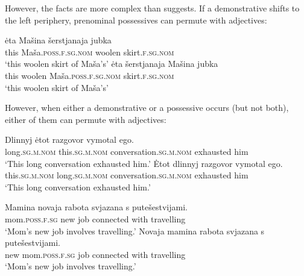 \documentclass[output=paper,
colorlinks,
citecolor=brown,
newtxmath
]{langscibook}
\begin{document}
\noindent However, the facts are more complex than \citeauthor{Pereltsvaig2007} suggests. If a demonstrative shifts to the left periphery, prenominal possessives can permute with adjectives:


\ea
    \ea \gll ėta Mašina šerstjanaja jubka\label{masinajubka1}\\
    this Maša.\textsc{poss.f.sg.nom} woolen skirt.\textsc{f.sg.nom}\\
    \glt `this woolen skirt of Maša's'
    \ex\label{masinajubka2} \gll ėta šerstjanaja Mašina jubka\\
    this woolen Maša.\textsc{poss.f.sg.nom} skirt.\textsc{f.sg.nom}\\
    \glt `this woolen skirt of Maša's'
\z\z

\noindent However, when either a demonstrative or a possessive occurs (but not both), either of them can permute with adjectives:


\ea\label{razgovor}
    \ea \gll Dlinnyj ėtot razgovor vymotal ego.\\
    long.\textsc{sg.m.nom} this.\textsc{sg.m.nom} conversation.\textsc{sg.m.nom} exhausted him\\
    \glt `This long conversation exhausted him.'
    \ex \gll Ėtot dlinnyj razgovor vymotal ego.\\
    this.\textsc{sg.m.nom} long.\textsc{sg.m.nom} conversation.\textsc{sg.m.nom} exhausted him\\
    \glt `This long conversation exhausted him.'
\z\z


\ea\label{rabota}
    \ea \gll Mamina novaja rabota svjazana s putešestvijami.\\
    mom.\textsc{poss.f.sg} new job connected with travelling\\
    \glt `Mom's new job involves travelling.'
    \ex \gll Novaja mamina rabota svjazana s putešestvijami.\\
    new mom.\textsc{poss.f.sg} job connected with travelling\\
    \glt `Mom's new job involves travelling.'
\z\z
\end{document}
